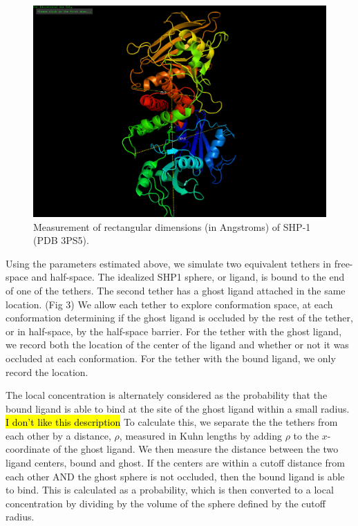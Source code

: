 \documentclass[../../AdvancementSummary.tex]{subfiles}
\begin{document}
\begin{figure}[H]
\includegraphics[width=\linewidth]{ResultsFigures/SHP1PyMol/LengthWidthDepth.png}
\caption{Measurement of rectangular dimensions (in Angstroms) of SHP-1 (PDB 3PS5).  }
\end{figure}

Using the parameters estimated above, we simulate two equivalent tethers in free-space and half-space.  The idealized SHP1 sphere, or ligand, is bound to the end of one of the tethers.  The second tether has a ghost ligand attached in the same location.  (Fig 3) We allow each tether to explore conformation space, at each conformation determining if the ghost ligand is occluded by the rest of the tether, or in half-space, by the half-space barrier. For the tether with the ghost ligand, we record both the location of the center of the ligand and whether or not it was occluded at each conformation.  For the tether with the bound ligand, we only record the location. 

The local concentration is alternately considered as the probability that the bound ligand is able to bind at the site of the ghost ligand within a small radius. \hl{I don't like this description}  To calculate this, we separate the the tethers from each other by a distance, $\rho$, measured in Kuhn lengths by adding $\rho$ to the $x$-coordinate of the ghost ligand. We then measure the distance between the two ligand centers, bound and ghost. If the centers are within a cutoff distance from each other AND the ghost sphere is not occluded, then the bound ligand is able to bind.  This is calculated as a probability, which is then converted to a local concentration by dividing by the volume of the sphere defined by the cutoff radius.
\end{document}
